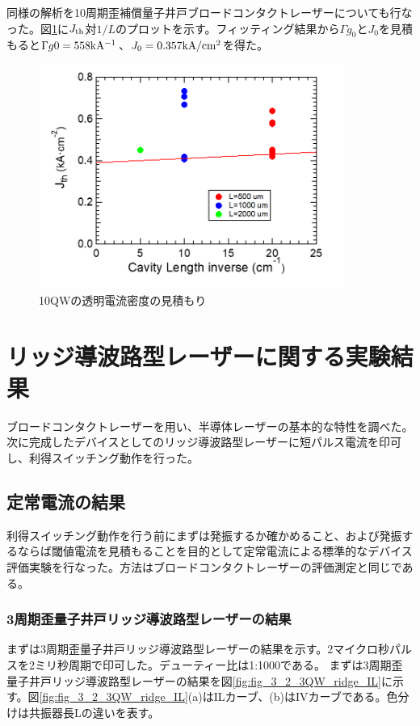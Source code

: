 {同様の解析を10周期歪補償量子井戸ブロードコンタクトレーザーについても行なった。図\ref{fig:fig_3_1_10QW_broadcontact_j0}に$J_{\rm{th}}$対$1/L$のプロットを示す。フィッティング結果から$\Gamma g_{0}$と$J_{0}$を見積もると$\Gamma g0=558   \rm{kA^{-1}}$、$J_{0}=0.357 \rm{kA/cm^{2}}$を得た。
\begin{figure}[t]
	\centering
	\includegraphics[width=10cm]{figure/fig_3_1_10QW_broadcontact_j0.png}
	\caption{10QWの透明電流密度の見積もり}
	\label{fig:fig_3_1_10QW_broadcontact_j0}
\end{figure}

\clearpage
\section{リッジ導波路型レーザーに関する実験結果}%
ブロードコンタクトレーザーを用い、半導体レーザーの基本的な特性を調べた。次に完成したデバイスとしてのリッジ導波路型レーザーに短パルス電流を印可し、利得スイッチング動作を行った。
\subsection{定常電流の結果}

利得スイッチング動作を行う前にまずは発振するか確かめること、および発振するならば閾値電流を見積もることを目的として定常電流による標準的なデバイス評価実験を行なった。方法はブロードコンタクトレーザーの評価測定と同じである。
\subsubsection{3周期歪量子井戸リッジ導波路型レーザーの結果}
まずは3周期歪量子井戸リッジ導波路型レーザーの結果を示す。2マイクロ秒パルスを2ミリ秒周期で印可した。デューティー比は1:1000である。
まずは3周期歪量子井戸リッジ導波路型レーザーの結果を図\ref{fig:fig_3_2_3QW_ridge_IL}に示す。図\ref{fig:fig_3_2_3QW_ridge_IL}(a)はILカーブ、(b)はIVカーブである。色分けは共振器長Lの違いを表す。

}
